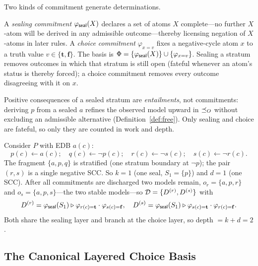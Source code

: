 Two kinds of commitment generate determinations.

\begin{definition}
  \label{def:datalog-basis}
  A \emph{sealing commitment} $\varphi_{\mathsf{seal}}(X)$ declares a set of atoms
  $X$ complete---no further $X$-atom will be derived in any admissible
  outcome---thereby licensing negation of $X$-atoms in later rules. A
  \emph{choice commitment} $\varphi_{x = v}$ fixes a negative-cycle atom $x$
  to a truth value $v \in \{\mathbf{t},\mathbf{f}\}$. The basis is
  $\Phi = \{\varphi_{\mathsf{seal}}(X)\} \cup \{\varphi_{x=v}\}$. Sealing a stratum
  removes outcomes in which that stratum is still open (fateful whenever an
  atom's status is thereby forced); a choice commitment removes every outcome
  disagreeing with it on $x$.
\end{definition}

\noindent
Positive consequences of a sealed stratum are \emph{entailments}, not
commitments: deriving $p$ from a sealed $a$ refines the observed model upward
in $\preceq_O$ without excluding an admissible alternative
(Definition~\ref{def:free}). Only sealing and choice are fateful, so only they
are counted in work and depth.

\begin{example}
  \label{ex:datalog}
  Consider $P$ with EDB $a(c)$:
  \[
    p(c) \leftarrow a(c); \quad
    q(c) \leftarrow \neg p(c); \quad
    r(c) \leftarrow \neg s(c); \quad
    s(c) \leftarrow \neg r(c).
  \]
  The fragment $\{a,p,q\}$ is stratified (one stratum boundary at $\neg p$);
  the pair $(r,s)$ is a single negative SCC. So $k = 1$ (one seal,
  $S_1 = \{p\}$) and $d = 1$ (one SCC). After all commitments are discharged
  two models remain, $o_r = \{a,p,r\}$ and $o_s = \{a,p,s\}$---the two stable
  models---so $\mathcal{D} = \{D^{(r)}, D^{(s)}\}$ with
  \[
    D^{(r)} = \varphi_{\mathsf{seal}}(S_1) \mathbin{\triangleright}
      \varphi_{r(c)=\mathbf{t}} \cdot \varphi_{s(c)=\mathbf{f}},
    \quad
    D^{(s)} = \varphi_{\mathsf{seal}}(S_1) \mathbin{\triangleright}
      \varphi_{s(c)=\mathbf{t}} \cdot \varphi_{r(c)=\mathbf{f}} .
  \]
  Both share the sealing layer and branch at the choice layer, so depth
  $= k + d = 2$.
\end{example}

\subsection{The Canonical Layered Choice Basis}
\label{sec:datalog-basis}

